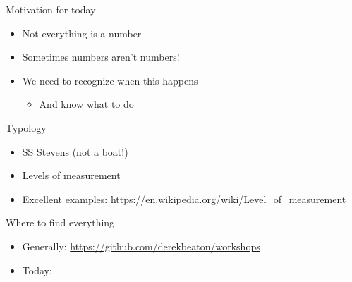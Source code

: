 \documentclass[
  ignorenonframetext,
]{beamer}
\providecommand{\tightlist}{%
  \setlength{\itemsep}{0pt}\setlength{\parskip}{0pt}}
\begin{document}
\begin{frame}{Motivation for today}
\protect\hypertarget{motivation-for-today}{}

\begin{itemize}[<+->]
\tightlist
\item
  Not everything is a number
\item
  Sometimes numbers aren't numbers!
\item
  We need to recognize when this happens

  \begin{itemize}[<+->]
  \tightlist
  \item
    And know what to do
  \end{itemize}
\end{itemize}

\end{frame}

\begin{frame}{Typology}
\protect\hypertarget{typology}{}

\begin{itemize}[<+->]
\tightlist
\item
  SS Stevens (not a boat!)
\item
  Levels of measurement
\item
  Excellent examples:
  \url{https://en.wikipedia.org/wiki/Level_of_measurement}
\end{itemize}

\end{frame}

\begin{frame}{Where to find everything}
\protect\hypertarget{where-to-find-everything}{}

\begin{itemize}[<+->]
\tightlist
\item
  Generally: \url{https://github.com/derekbeaton/workshops}
\item
  Today:
\end{itemize}

\end{frame}
\end{document}
